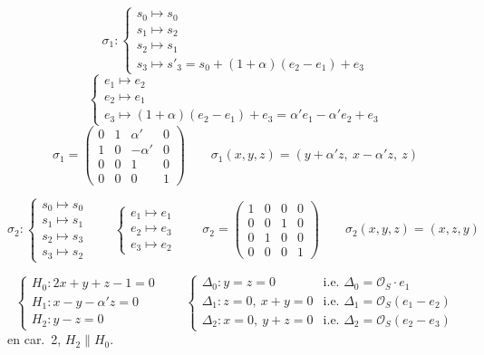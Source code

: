 \documentclass[11pt,a4paper]{article}
\begin{document}
\[
\sigma_1 : \begin{cases} s_0 \mapsto s_0 \\ s_1 \mapsto s_2 \\ s_2 \mapsto s_1 \\ s_3 \mapsto s'_3 = s_0 + (1+\alpha)(e_2 - e_1) + e_3 \end{cases}
\]
\[
\begin{cases} e_1 \mapsto e_2 \\ e_2 \mapsto e_1 \\ e_3 \mapsto (1+\alpha)(e_2 - e_1) + e_3 = \alpha' e_1 - \alpha' e_2 + e_3 \end{cases}
\]
\[
\sigma_1 = \begin{pmatrix} 0 & 1 & \alpha' & 0 \\ 1 & 0 & -\alpha' & 0 \\ 0 & 0 & 1 & 0 \\ 0 & 0 & 0 & 1 \end{pmatrix}
\qquad
\boxed{\sigma_1(x,y,z) = (y + \alpha' z,\ x - \alpha' z,\ z)}
\]


\[
\sigma_2 : \begin{cases} s_0 \mapsto s_0 \\ s_1 \mapsto s_1 \\ s_2 \mapsto s_3 \\ s_3 \mapsto s_2 \end{cases}
\qquad
\begin{cases} e_1 \mapsto e_1 \\ e_2 \mapsto e_3 \\ e_3 \mapsto e_2 \end{cases}
\qquad
\sigma_2 = \begin{pmatrix} 1 & 0 & 0 & 0 \\ 0 & 0 & 1 & 0 \\ 0 & 1 & 0 & 0 \\ 0 & 0 & 0 & 1 \end{pmatrix}
\qquad
\boxed{\sigma_2(x,y,z) = (x, z, y)}
\]

\[
\begin{cases}
H_0 : 2x + y + z - 1 = 0 \\
H_1 : x - y - \alpha' z = 0 \\
H_2 : y - z = 0
\end{cases}
\qquad
\begin{cases}
\Delta_0 : y = z = 0 & \text{i.e. } \Delta_0 = \mathcal{O}_S\cdot e_1 \\
\Delta_1 : z = 0,\ x + y = 0 & \text{i.e. } \Delta_1 = \mathcal{O}_S(e_1 - e_2) \\
\Delta_2 : x = 0,\ y + z = 0 & \text{i.e. } \Delta_2 = \mathcal{O}_S(e_2 - e_3)
\end{cases}
\]
en car.\ 2, $H_2 \parallel H_0$.
\end{document}

